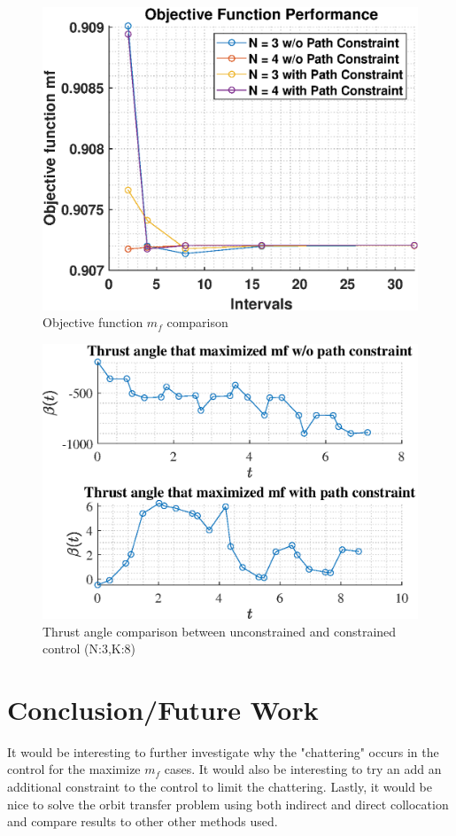 \documentclass[]{article}
\begin{document}
	\begin{figure}
		\centering
		\includegraphics[scale=0.75]{maxMfComparison.eps}
		\caption{Objective function \(m_f\) comparison}
		\label{fig:maxMfComparison}
	\end{figure}
	\begin{figure}
		\centering
		\includegraphics[scale=0.75]{maxMfBetaCompare.eps}
		\caption{Thrust angle comparison between unconstrained and constrained control (N:3,K:8)}
		\label{fig:maxMfBetaCompare}
    \end{figure}

	\section{Conclusion/Future Work}
	It would be interesting to further investigate why the "chattering" occurs in the control for the maximize \(m_f\) cases. It would also be interesting to try an add an additional constraint to the control to limit the chattering. Lastly, it would be nice to solve the orbit transfer problem using both indirect and direct collocation and compare results to other other methods used.
	
\end{document}
